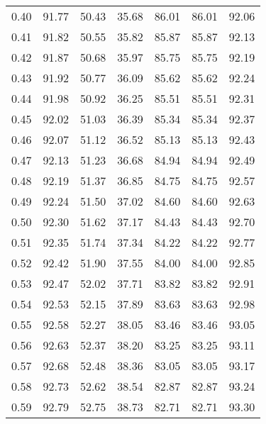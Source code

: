 \begin{tabular}{|c|c|c|c|c|c|c|}
      0.40 &     91.77 &     50.43 &      35.68 &   86.01 &      86.01 &         92.06 \\
      0.41 &     91.82 &     50.55 &      35.82 &   85.87 &      85.87 &         92.13 \\
      0.42 &     91.87 &     50.68 &      35.97 &   85.75 &      85.75 &         92.19 \\
      0.43 &     91.92 &     50.77 &      36.09 &   85.62 &      85.62 &         92.24 \\
      0.44 &     91.98 &     50.92 &      36.25 &   85.51 &      85.51 &         92.31 \\
      0.45 &     92.02 &     51.03 &      36.39 &   85.34 &      85.34 &         92.37 \\
      0.46 &     92.07 &     51.12 &      36.52 &   85.13 &      85.13 &         92.43 \\
      0.47 &     92.13 &     51.23 &      36.68 &   84.94 &      84.94 &         92.49 \\
      0.48 &     92.19 &     51.37 &      36.85 &   84.75 &      84.75 &         92.57 \\
      0.49 &     92.24 &     51.50 &      37.02 &   84.60 &      84.60 &         92.63 \\
      0.50 &     92.30 &     51.62 &      37.17 &   84.43 &      84.43 &         92.70 \\
      0.51 &     92.35 &     51.74 &      37.34 &   84.22 &      84.22 &         92.77 \\
      0.52 &     92.42 &     51.90 &      37.55 &   84.00 &      84.00 &         92.85 \\
      0.53 &     92.47 &     52.02 &      37.71 &   83.82 &      83.82 &         92.91 \\
      0.54 &     92.53 &     52.15 &      37.89 &   83.63 &      83.63 &         92.98 \\
      0.55 &     92.58 &     52.27 &      38.05 &   83.46 &      83.46 &         93.05 \\
      0.56 &     92.63 &     52.37 &      38.20 &   83.25 &      83.25 &         93.11 \\
      0.57 &     92.68 &     52.48 &      38.36 &   83.05 &      83.05 &         93.17 \\
      0.58 &     92.73 &     52.62 &      38.54 &   82.87 &      82.87 &         93.24 \\
      0.59 &     92.79 &     52.75 &      38.73 &   82.71 &      82.71 &         93.30 \\

\end{tabular}
